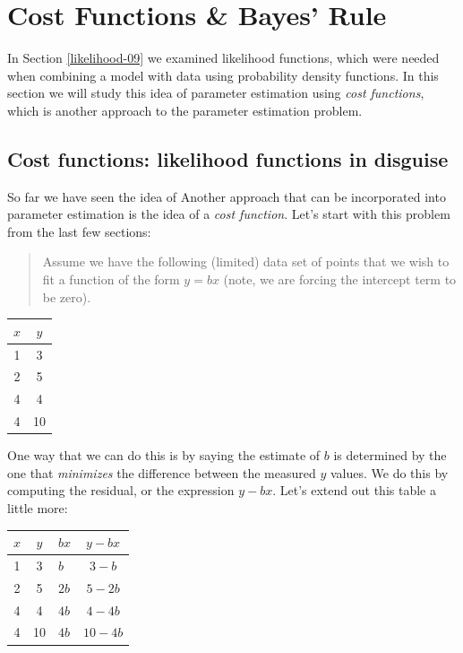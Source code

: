 \documentclass[
]{book}
\theoremstyle{definition}
\theoremstyle{definition}
\theoremstyle{definition}
\theoremstyle{remark}
\begin{document}
\hypertarget{cost-fns-10}{%
\chapter{Cost Functions \& Bayes' Rule}\label{cost-fns-10}}

In Section \ref{likelihood-09} we examined likelihood functions, which were needed when combining a model with data using probability density functions. In this section we will study this idea of parameter estimation using \emph{cost functions}, which is another approach to the parameter estimation problem.

\hypertarget{cost-functions-likelihood-functions-in-disguise}{%
\section{Cost functions: likelihood functions in disguise}\label{cost-functions-likelihood-functions-in-disguise}}

So far we have seen the idea of Another approach that can be incorporated into parameter estimation is the idea of a \emph{cost function}. Let's start with this problem from the last few sections:

\begin{quote}
Assume we have the following (limited) data set of points that we wish to fit a function of the form \(y=bx\) (note, we are forcing the intercept term to be zero).
\end{quote}

\begin{longtable}[]{@{}cc@{}}
\toprule
\(x\) & \(y\) \\
\midrule
\endhead
1 & 3 \\
2 & 5 \\
4 & 4 \\
4 & 10 \\
\bottomrule
\end{longtable}

One way that we can do this is by saying the estimate of \(b\) is determined by the one that \emph{minimizes} the difference between the measured \(y\) values. We do this by computing the residual, or the expression \(y-bx\). Let's extend out this table a little more:

\begin{longtable}[]{@{}cclc@{}}
\toprule
\(x\) & \(y\) & \(bx\) & \(y-bx\) \\
\midrule
\endhead
1 & 3 & \(b\) & \(3-b\) \\
2 & 5 & \(2b\) & \(5-2b\) \\
4 & 4 & \(4b\) & \(4-4b\) \\
4 & 10 & \(4b\) & \(10-4b\) \\
\bottomrule
\end{longtable}
\end{document}

